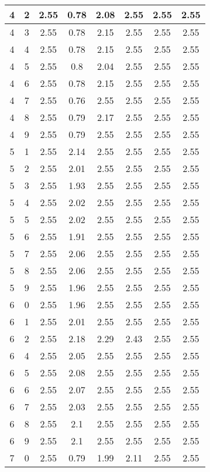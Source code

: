 \begin{longtable}{|c|c||c||c|c|c||c|c|}
	4 & 2 & 2.55 & 0.78 & 2.08 & 2.55 & 2.55 & 2.55 \\ \hline
	4 & 3 & 2.55 & 0.78 & 2.15 & 2.55 & 2.55 & 2.55 \\ \hline
	4 & 4 & 2.55 & 0.78 & 2.15 & 2.55 & 2.55 & 2.55 \\ \hline
	4 & 5 & 2.55 & 0.8 & 2.04 & 2.55 & 2.55 & 2.55 \\ \hline
	4 & 6 & 2.55 & 0.78 & 2.15 & 2.55 & 2.55 & 2.55 \\ \hline
	4 & 7 & 2.55 & 0.76 & 2.55 & 2.55 & 2.55 & 2.55 \\ \hline
	4 & 8 & 2.55 & 0.79 & 2.17 & 2.55 & 2.55 & 2.55 \\ \hline
	4 & 9 & 2.55 & 0.79 & 2.55 & 2.55 & 2.55 & 2.55 \\ \hline
	5 & 1 & 2.55 & 2.14 & 2.55 & 2.55 & 2.55 & 2.55 \\ \hline
	5 & 2 & 2.55 & 2.01 & 2.55 & 2.55 & 2.55 & 2.55 \\ \hline
	5 & 3 & 2.55 & 1.93 & 2.55 & 2.55 & 2.55 & 2.55 \\ \hline
	5 & 4 & 2.55 & 2.02 & 2.55 & 2.55 & 2.55 & 2.55 \\ \hline
	5 & 5 & 2.55 & 2.02 & 2.55 & 2.55 & 2.55 & 2.55 \\ \hline
	5 & 6 & 2.55 & 1.91 & 2.55 & 2.55 & 2.55 & 2.55 \\ \hline
	5 & 7 & 2.55 & 2.06 & 2.55 & 2.55 & 2.55 & 2.55 \\ \hline
	5 & 8 & 2.55 & 2.06 & 2.55 & 2.55 & 2.55 & 2.55 \\ \hline
	5 & 9 & 2.55 & 1.96 & 2.55 & 2.55 & 2.55 & 2.55 \\ \hline
	6 & 0 & 2.55 & 1.96 & 2.55 & 2.55 & 2.55 & 2.55 \\ \hline
	6 & 1 & 2.55 & 2.01 & 2.55 & 2.55 & 2.55 & 2.55 \\ \hline
	6 & 2 & 2.55 & 2.18 & 2.29 & 2.43 & 2.55 & 2.55 \\ \hline
	6 & 4 & 2.55 & 2.05 & 2.55 & 2.55 & 2.55 & 2.55 \\ \hline
	6 & 5 & 2.55 & 2.08 & 2.55 & 2.55 & 2.55 & 2.55 \\ \hline
	6 & 6 & 2.55 & 2.07 & 2.55 & 2.55 & 2.55 & 2.55 \\ \hline
	6 & 7 & 2.55 & 2.03 & 2.55 & 2.55 & 2.55 & 2.55 \\ \hline
	6 & 8 & 2.55 & 2.1 & 2.55 & 2.55 & 2.55 & 2.55 \\ \hline
	6 & 9 & 2.55 & 2.1 & 2.55 & 2.55 & 2.55 & 2.55 \\ \hline
	7 & 0 & 2.55 & 0.79 & 1.99 & 2.11 & 2.55 & 2.55 \\ \hline

\end{longtable}
